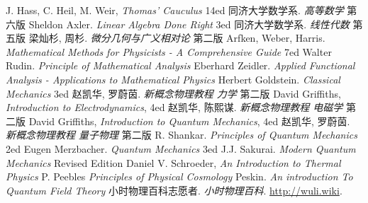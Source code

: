 \begin{thebibliography}{99}
J. Hass, C. Heil, M. Weir, \textsl{Thomas' Cauculus} 14ed
同济大学数学系. \textsl{高等数学} 第六版
Sheldon Axler. \textsl{Linear Algebra Done Right} 3ed
同济大学数学系. \textsl{线性代数} 第五版
梁灿杉, 周杉. \textsl{微分几何与广义相对论} 第二版
Arfken, Weber, Harris. \textsl{Mathematical Methods for Physicists - A Comprehensive Guide} 7ed
Walter Rudin. \textsl{Principle of Mathematical Analysis}
Eberhard Zeidler. \textsl{Applied Functional Analysis - Applications to Mathematical Physics}
Herbert Goldstein. \textsl{Classical Mechanics} 3ed
赵凯华, 罗蔚茵. \textsl{新概念物理教程 力学} 第二版
David Griffiths, \textsl{Introduction to Electrodynamics}, 4ed
赵凯华, 陈熙谋. \textsl{新概念物理教程 电磁学} 第二版
David Griffiths, \textsl{Introduction to Quantum Mechanics}, 4ed
赵凯华, 罗蔚茵. \textsl{新概念物理教程 量子物理} 第二版
R. Shankar. \textsl{Principles of Quantum Mechanics} 2ed
Eugen Merzbacher. \textsl{Quantum  Mechanics} 3ed
J.J. Sakurai. \textsl{Modern Quantum Mechanics} Revised Edition
Daniel V. Schroeder, \textsl{An Introduction to Thermal Physics}
P. Peebles \textsl{Principles of Physical Cosmology}
Peskin. \textsl{An introduction To Quantum Field Theory}
小时物理百科志愿者. \textsl{小时物理百科}. \href{http://wuli.wiki}{http://wuli.wiki}. 
\end{thebibliography}
